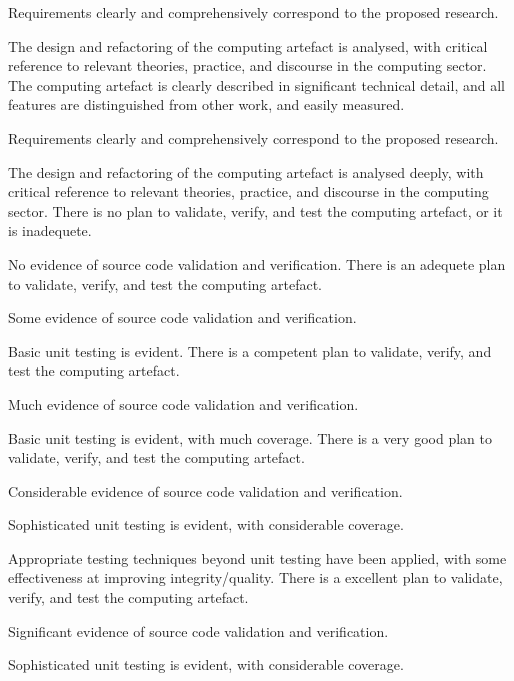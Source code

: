 \begin{markingrubric}
            \par Requirements clearly and comprehensively correspond to the proposed research.
            \par The design and refactoring of the computing artefact is analysed, with critical reference to relevant theories, practice, and discourse in the computing sector.
        \grade The computing artefact is clearly described in significant technical detail, and all features are distinguished from other work, and easily measured.
            \par Requirements clearly and comprehensively correspond to the proposed research.
            \par The design and refactoring of the computing artefact is analysed deeply, with critical reference to relevant theories, practice, and discourse in the computing sector.
%
        \grade \fail There is no plan to validate, verify, and test the computing artefact, or it is inadequete.
            \par No evidence of source code validation and verification.
        \grade There is an adequete plan to validate, verify, and test the computing artefact.
            \par Some evidence of source code validation and verification.
            \par Basic unit testing is evident.       
        \grade There is a competent plan to validate, verify, and test the computing artefact.
            \par Much evidence of source code validation and verification.
            \par Basic unit testing is evident, with much coverage.
        \grade There is a very good plan to validate, verify, and test the computing artefact.
            \par Considerable evidence of source code validation and verification.
            \par Sophisticated unit testing is evident, with considerable coverage.
            \par Appropriate testing techniques beyond unit testing have been applied, with some effectiveness at improving integrity/quality.
        \grade There is a excellent plan to validate, verify, and test the computing artefact.
            \par Significant evidence of source code validation and verification.
            \par Sophisticated unit testing is evident, with considerable coverage.

\end{markingrubric}

